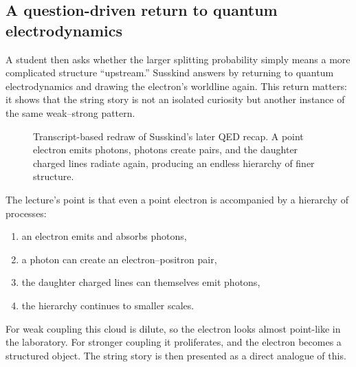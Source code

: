 \subsection{A question-driven return to quantum electrodynamics}

A student then asks whether the larger splitting probability simply means a more complicated structure ``upstream.'' Susskind answers by returning to quantum electrodynamics and drawing the electron's worldline again. This return matters: it shows that the string story is not an isolated curiosity but another instance of the same weak--strong pattern.

\begin{figure}[h]
\centering
{}
\caption{Transcript-based redraw of Susskind's later QED recap. A point electron emits photons, photons create pairs, and the daughter charged lines radiate again, producing an endless hierarchy of finer structure.}
\end{figure}

The lecture's point is that even a point electron is accompanied by a hierarchy of processes:
\begin{enumerate}
\item an electron emits and absorbs photons,
\item a photon can create an electron--positron pair,
\item the daughter charged lines can themselves emit photons,
\item the hierarchy continues to smaller scales.
\end{enumerate}
For weak coupling this cloud is dilute, so the electron looks almost point-like in the laboratory. For stronger coupling it proliferates, and the electron becomes a structured object. The string story is then presented as a direct analogue of this.

